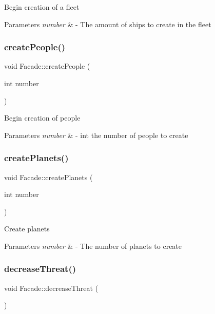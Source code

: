Begin creation of a fleet 
\begin{DoxyParams}{Parameters}
{\em number} & -\/ The amount of ships to create in the fleet \\
\hline
\end{DoxyParams}
\mbox{\label{classFacade_aa4349e600d23bffb8077cfcf991ec115}} 
\subsubsection{\texorpdfstring{create\+People()}{createPeople()}}
{\footnotesize\ttfamily void Facade\+::create\+People (\begin{DoxyParamCaption}\item[{int}]{number }\end{DoxyParamCaption})}

Begin creation of people 
\begin{DoxyParams}{Parameters}
{\em number} & -\/ int the number of people to create \\
\hline
\end{DoxyParams}
\mbox{\label{classFacade_ac8e923ca1b69cf459137572132a034b1}} 
\subsubsection{\texorpdfstring{create\+Planets()}{createPlanets()}}
{\footnotesize\ttfamily void Facade\+::create\+Planets (\begin{DoxyParamCaption}\item[{int}]{number }\end{DoxyParamCaption})}

Create planets 
\begin{DoxyParams}{Parameters}
{\em number} & -\/ The number of planets to create \\
\hline
\end{DoxyParams}
\mbox{\label{classFacade_ac64e351ea722a24829220fec59d7855f}} 
\subsubsection{\texorpdfstring{decrease\+Threat()}{decreaseThreat()}}
{\footnotesize\ttfamily void Facade\+::decrease\+Threat (\begin{DoxyParamCaption}{ }\end{DoxyParamCaption})}


